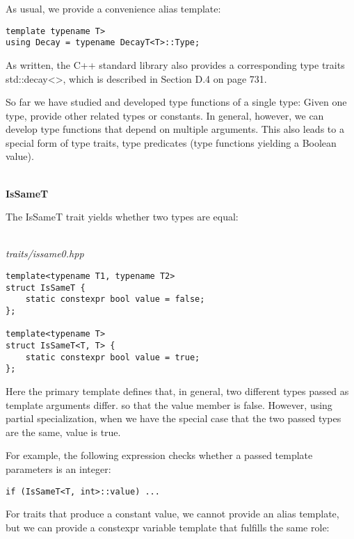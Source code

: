 As usual, we provide a convenience alias template:

\begin{lstlisting}[style=styleCXX]
template typename T>
using Decay = typename DecayT<T>::Type;
\end{lstlisting}

As written, the C++ standard library also provides a corresponding type traits std::decay<>, which is described in Section D.4 on page 731.


So far we have studied and developed type functions of a single type: Given one type, provide other related types or constants. In general, however, we can develop type functions that depend on multiple arguments. This also leads to a special form of type traits, type predicates (type functions yielding a Boolean value).

\hspace*{\fill} \\ %
\noindent
\textbf{IsSameT}

The IsSameT trait yields whether two types are equal:

\hspace*{\fill} \\ %
\noindent
\textit{traits/issame0.hpp}
\begin{lstlisting}[style=styleCXX]
template<typename T1, typename T2>
struct IsSameT {
	static constexpr bool value = false;
};

template<typename T>
struct IsSameT<T, T> {
	static constexpr bool value = true;
};
\end{lstlisting}

Here the primary template defines that, in general, two different types passed as template arguments differ. so that the value member is false. However, using partial specialization, when we have the special case that the two passed types are the same, value is true.

For example, the following expression checks whether a passed template parameters is an integer:

\begin{lstlisting}[style=styleCXX]
if (IsSameT<T, int>::value) ...
\end{lstlisting}

For traits that produce a constant value, we cannot provide an alias template, but we can provide a constexpr variable template that fulfills the same role:

